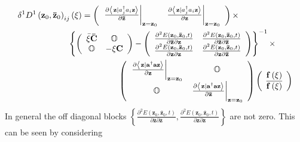 \documentclass[aps,preprint]{revtex4}%
\begin{document}
\begin{align}
&  \delta^{1}D^{1}\left(  \mathbf{z}{_{0},\mathbf{\bar{z}}_{0}}\right)
_{ij}\left(  \xi\right)  =\left(
\begin{array}
[c]{cc}%
\left.  \frac{\partial\left\langle \left.  \mathbf{z}\right\vert a_{j}^{\dag
}a_{i}\mathbf{z}\right\rangle }{\partial\mathbf{\bar{z}}}\right\vert
_{\mathbf{z=z}_{0}} & \left.  \frac{\partial\left\langle \left.
\mathbf{z}\right\vert a_{j}^{\dag}a_{i}\mathbf{z}\right\rangle }%
{\partial\mathbf{z}}\right\vert _{\mathbf{z=z}_{0}}%
\end{array}
\right)  \times\nonumber\\
&  \quad\quad\quad\quad\quad\quad\left\{  \left(
\begin{array}
[c]{cc}%
\bar{\xi}\mathbf{\bar{C}} & \mathbb{O}\\
\mathbb{O} & -\xi\mathbf{C}%
\end{array}
\right)  -\left(
\begin{array}
[c]{cc}%
\frac{\partial^{2}E\left(  \mathbf{z}_{0},\mathbf{\bar{z}}_{0},t\right)
}{\partial\mathbf{\bar{z}}\partial\mathbf{z}} & \frac{\partial^{2}E\left(
\mathbf{z}_{0},\mathbf{\bar{z}}_{0},t\right)  }{\partial\mathbf{\bar{z}%
}\partial\mathbf{\bar{z}}}\\
\frac{\partial^{2}E\left(  \mathbf{z}_{0},\mathbf{\bar{z}}_{0},t\right)
}{\partial\mathbf{z}\partial\mathbf{z}} & \frac{\partial^{2}E\left(
\mathbf{z}_{0},\mathbf{\bar{z}}_{0},t\right)  }{\partial\mathbf{z}%
\partial\mathbf{\bar{z}}}%
\end{array}
\right)  \right\}  ^{-1}\times\nonumber\\
&  \quad\quad\quad\quad\quad\quad\quad\quad\quad\quad\quad\quad\left(
\begin{array}
[c]{cc}%
\left.  \frac{\partial\left\langle \left.  \mathbf{z}\right\vert
\mathbf{a}^{\dag}\mathbf{az}\right\rangle }{\partial\mathbf{z}}\right\vert
_{\mathbf{z=z}_{0}} & \mathbb{O}\\
\mathbb{O} & \left.  \frac{\partial\left\langle \left.  \mathbf{z}\right\vert
\mathbf{a}^{\dag}\mathbf{az}\right\rangle }{\partial\mathbf{\bar{z}}%
}\right\vert _{\mathbf{z=z}_{0}}%
\end{array}
\right)  \left(
\begin{array}
[c]{c}%
\mathbf{f}\left(  \xi\right) \\
\overline{\mathbf{f}\left(  \xi\right)  }%
\end{array}
\right)
\end{align}
In general the off diagonal blocks $\left\{  \frac{\partial^{2}E\left(
\mathbf{z}_{0},\mathbf{\bar{z}}_{0},t\right)  }{\partial\mathbf{\bar{z}%
}\partial\mathbf{\bar{z}}},\frac{\partial^{2}E\left(  \mathbf{z}%
_{0},\mathbf{\bar{z}}_{0},t\right)  }{\partial\mathbf{z}\partial\mathbf{z}%
}\right\}  $ are not zero. This can be seen by considering
\end{document}
